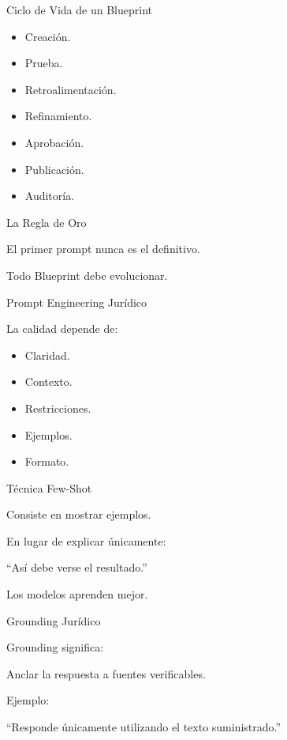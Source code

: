 \documentclass[aspectratio=169]{beamer}
\begin{document}
\begin{frame}{Ciclo de Vida de un Blueprint}


\begin{itemize}
  \item Creación.
  \item Prueba.
  \item Retroalimentación.
  \item Refinamiento.
  \item Aprobación.
  \item Publicación.
  \item Auditoría.
\end{itemize}
\end{frame}

\begin{frame}{La Regla de Oro}


El primer prompt nunca es el definitivo.

Todo Blueprint debe evolucionar.

\end{frame}

\begin{frame}{Prompt Engineering Jurídico}


La calidad depende de:

\begin{itemize}
  \item Claridad.
  \item Contexto.
  \item Restricciones.
  \item Ejemplos.
  \item Formato.
\end{itemize}
\end{frame}

\begin{frame}{Técnica Few-Shot}


Consiste en mostrar ejemplos.

En lugar de explicar únicamente:

``Así debe verse el resultado.''

Los modelos aprenden mejor.

\end{frame}

\begin{frame}{Grounding Jurídico}


Grounding significa:

Anclar la respuesta a fuentes verificables.

Ejemplo:

``Responde únicamente utilizando el texto suministrado.''

\end{frame}
\end{document}
